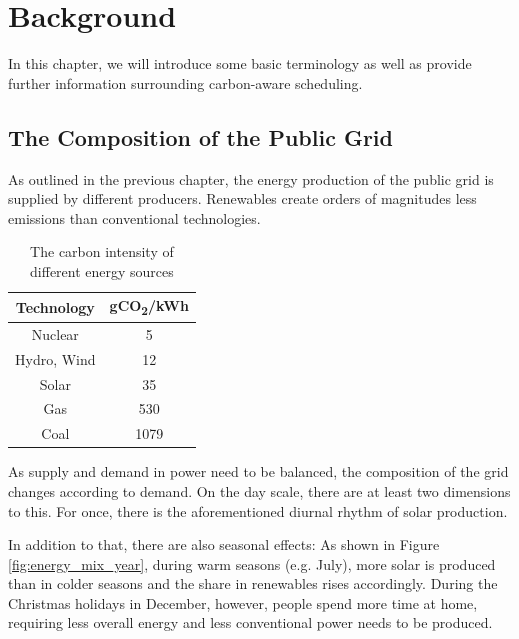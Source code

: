 \chapter{Background}
\label{chap:backgroud}

In this chapter, we will introduce some basic terminology as well as provide further information surrounding carbon-aware scheduling.

\section{The Composition of the Public Grid}

As outlined in the previous chapter, the energy production of the public grid is supplied by different producers.
Renewables create orders of magnitudes less emissions than conventional technologies.  

\begin{table}[h!]
    \centering
    \begin{tabular}{|c|c|}
    \hline
        Technology & gCO\textsubscript{2}/kWh \\ \hline
        Nuclear & 5 \\ \hline
        Hydro, Wind & 12 \\ \hline
        Solar & 35 \\ \hline
        Gas & 530 \\ \hline
        Coal & 1079 \\ \hline
    \end{tabular}
    \caption{The carbon intensity of different energy sources }
    \label{tab:carbon_intensities}
\end{table}

As supply and demand in power need to be balanced, the composition of the grid changes according to demand.
On the day scale, there are at least two dimensions to this. For once, there is the aforementioned diurnal rhythm of solar production.

In addition to that, there are also seasonal effects:
As shown in Figure \ref{fig:energy_mix_year}, during warm seasons (e.g. July), more solar is produced than in colder seasons and the share in renewables rises accordingly.
During the Christmas holidays in December, however, people spend more time at home, requiring less overall energy and less conventional power needs to be produced.

